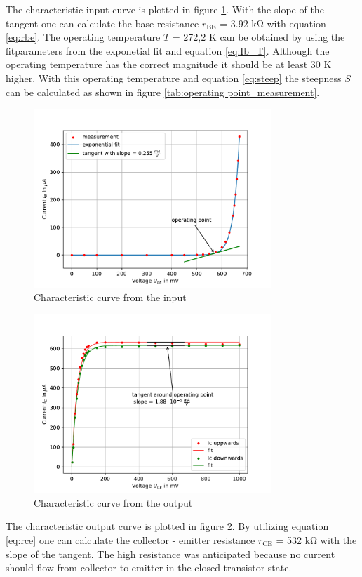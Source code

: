 \documentclass[11pt, a4paper]{article}
\begin{document}
The characteristic input curve is plotted in figure \ref{fig:Eincur}. With the slope of the tangent one can calculate the base resistance $r_{\text{BE}}$ = 3.92 \si{\kilo\ohm} with equation \ref{eq:rbe}. 
The operating temperature $T$ = 272,2 \si{\kelvin} can be obtained by using the fitparameters from the exponetial fit and equation \ref{eq:Ib_T}. Although the operating temperature has the correct magnitude it should be at least 30 \si{\kelvin} higher.
With this operating temperature and equation \ref{eq:steep} the steepness $S$ can be calculated as shown in figure \ref{tab:operating point_measurement}.

\begin{figure}[h]
    \centering
    \includegraphics[width=0.8\textwidth]{plots/Eingangskennlinie.pdf}
    \caption{Characteristic curve from the input}
    \label{fig:Eincur}
\end{figure}

\begin{figure}[h]
    \centering
    \includegraphics[width=0.8\textwidth]{plots/Ausgangskennlinie.pdf}
    \caption{Characteristic curve from the output}
    \label{fig:Outcur}
\end{figure}
The characteristic output curve is plotted in figure \ref{fig:Outcur}. By utilizing equation \ref{eq:rce} one can calculate the collector - emitter resistance $r_{\text{CE}}$ = 532 \si{\kilo\ohm} with the slope of the tangent.
The high resistance was anticipated because no current should flow from collector to emitter in the closed transistor state.
\end{document}
